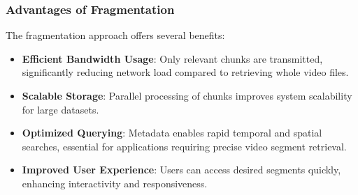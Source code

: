 \documentclass[conference]{IEEEtran}
\begin{document}
\subsubsection{Advantages of Fragmentation}
The fragmentation approach offers several benefits:
\begin{itemize}
    \item \textbf{Efficient Bandwidth Usage}: Only relevant chunks are transmitted, significantly reducing network load compared to retrieving whole video files.
    \item \textbf{Scalable Storage}: Parallel processing of chunks improves system scalability for large datasets.
    \item \textbf{Optimized Querying}: Metadata enables rapid temporal and spatial searches, essential for applications requiring precise video segment retrieval.
    \item \textbf{Improved User Experience}: Users can access desired segments quickly, enhancing interactivity and responsiveness.
\end{itemize}





\end{document}

